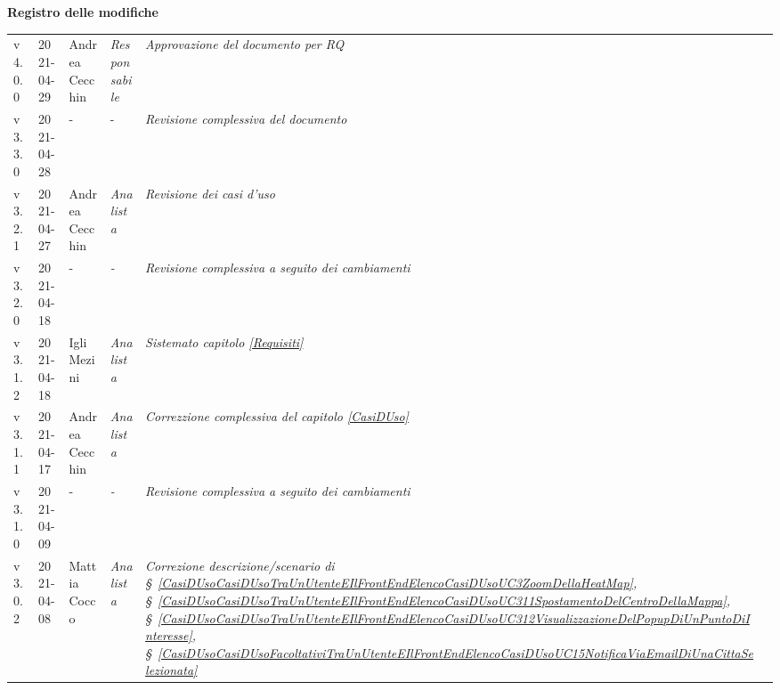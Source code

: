 \quad
\begin{center}
	\LARGE\textbf{Registro delle modifiche}
\end{center}
\def\tabularxcolumn#1{m{#1}}
{

\begin{center}
	\renewcommand{\arraystretch}{1.4}
	\begin{longtable}[c]{|p{2cm-1\tabcolsep}|p{2cm}|p{3cm-2\tabcolsep}|p{}|p{}|p{3cm}|}
		\hline
		\rowcolor{airforceblue}
		\makecell[c]{\textbf{Versione}} & \makecell[c]{\textbf{Data}} & \makecell[c]{\textbf{Autore}} & \makecell[c]{\textbf{Ruolo}} & \makecell[c]{\textbf{Modifica}} & \makecell[c]{\textbf{Verificatore}} \\
		\hline
		\centering v4.0.0 & 2021-04-29 & Andrea Cecchin & \centering \textit{Responsabile} & \textit{Approvazione del documento per RQ} & \makecell[c]{-}\\
		\hline
		\centering v3.3.0 & 2021-04-28 & \centering - & \centering - & \textit{Revisione complessiva del documento} & \makecell[c]{Emma Roveroni}\\
		\hline
		\centering v3.2.1 & 2021-04-27 & Andrea Cecchin & \centering \textit{Analista} & \textit{Revisione dei casi d'uso} & \makecell[c]{Andrea Dorigo}\\
		\hline
		\centering v3.2.0 & 2021-04-18 & \centering - & \centering \textit{-} & \textit{Revisione complessiva a seguito dei cambiamenti} & \makecell[c]{Emma Roveroni}\\
		\hline
		\centering v3.1.2 & 2021-04-18 & Igli Mezini & \centering \textit{Analista} & \textit{Sistemato capitolo \ref{Requisiti}} & \makecell[c]{Alfredo Graziano}\\
		\hline
		\centering v3.1.1 & 2021-04-17 & Andrea Cecchin & \centering \textit{Analista} & \textit{Correzzione complessiva del capitolo \ref{CasiDUso}} & \makecell[c]{Alfredo Graziano}\\
		\hline
		\centering v3.1.0 & 2021-04-09 & \centering - & \centering \textit{-} & \textit{Revisione complessiva a seguito dei cambiamenti} & \makecell[c]{Emma Roveroni}\\
		\hline
		\centering v3.0.2 & 2021-04-08 & Mattia Cocco & \centering \textit{Analista} & \textit{Correzione descrizione/scenario di \S~\ref{CasiDUsoCasiDUsoTraUnUtenteEIlFrontEndElencoCasiDUsoUC3ZoomDellaHeatMap}, \S~\ref{CasiDUsoCasiDUsoTraUnUtenteEIlFrontEndElencoCasiDUsoUC311SpostamentoDelCentroDellaMappa}, \S~\ref{CasiDUsoCasiDUsoTraUnUtenteEIlFrontEndElencoCasiDUsoUC312VisualizzazioneDelPopupDiUnPuntoDiInteresse}, \S~\ref{CasiDUsoCasiDUsoFacoltativiTraUnUtenteEIlFrontEndElencoCasiDUsoUC15NotificaViaEmailDiUnaCittaSelezionata}} &  \makecell[c]{Emma Roveroni} \\

\end{longtable}
\end{center}}
